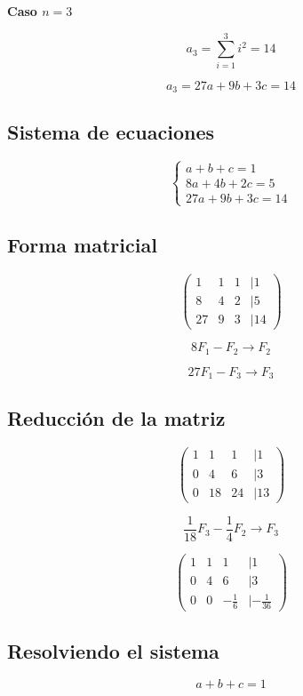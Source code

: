 \textbf{Caso \( n = 3 \)}

\[
a_3 = \sum_{i=1}^{3} i^2 = 14
\]

\[
a_3 = 27a + 9b + 3c = 14
\]

\subsection*{Sistema de ecuaciones}

\[
\begin{cases}
a + b + c = 1 \\
8a + 4b + 2c = 5 \\
27a + 9b + 3c = 14
\end{cases}
\]

\subsection*{Forma matricial}

\[
\begin{pmatrix}
1 & 1 & 1 & | 1 \\
8 & 4 & 2 & | 5 \\
27 & 9 & 3 & | 14
\end{pmatrix}
\]

\[
8F_1 - F_2 \rightarrow F_2
\]

\[
27F_1 - F_3 \rightarrow F_3
\]

\subsection*{Reducción de la matriz}

\[
\begin{pmatrix}
1 & 1 & 1 & | 1 \\
0 & 4 & 6 & | 3 \\
0 & 18 & 24 & | 13
\end{pmatrix}
\]

\[
\frac{1}{18} F_3 - \frac{1}{4} F_2 \rightarrow F_3
\]

\[
\begin{pmatrix}
1 & 1 & 1 & | 1 \\
0 & 4 & 6 & | 3 \\
0 & 0 & -\frac{1}{6} & | -\frac{1}{36}
\end{pmatrix}
\]

\subsection*{Resolviendo el sistema}

\[
a + b + c = 1
\]

